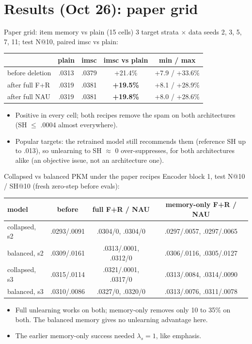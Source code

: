 \documentclass{beamer}
\begin{document}
\section{Results (Oct 26): paper grid}

\begin{frame}{Paper grid: item memory vs plain (15 cells)}
3 target strata $\times$ data seeds 2, 3, 5, 7, 11; test N@10, paired imsc vs plain:
\begin{center}
\footnotesize\setlength{\tabcolsep}{4pt}
\begin{tabular}{|l|c|c|c|c|}
\hline
 & plain & imsc & imsc vs plain & min / max \\
\hline
before deletion   & .0313 & .0379 & +21.4\% & +7.9 / +33.6\% \\
after full F+R    & .0319 & .0381 & \textbf{+19.5\%} & +8.1 / +28.9\% \\
after full NAU    & .0319 & .0381 & \textbf{+19.8\%} & +8.0 / +28.6\% \\
\hline
\end{tabular}
\end{center}
\begin{itemize}
  \item Positive in every cell; both recipes remove the spam on both
        architectures (SH $\leq$ .0004 almost everywhere).
  \item Popular targets: the retrained model still recommends them (reference SH
        up to .013), so unlearning to SH $\approx$ 0 over-suppresses, for both
        architectures alike (an objective issue, not an architecture one).
\end{itemize}
\end{frame}

\begin{frame}{Collapsed vs balanced PKM under the paper recipes}
Encoder block 1, test N@10 / SH@10 (fresh zero-step before evals):
\begin{center}
\footnotesize\setlength{\tabcolsep}{3pt}
\begin{tabular}{|l|c|c|c|}
\hline
model & before & full F+R / NAU & memory-only F+R / NAU \\
\hline
collapsed, s2 & .0293/.0091 & .0304/0, .0304/0 & .0297/.0057, .0297/.0065 \\
balanced, s2  & .0309/.0161 & .0313/.0001, .0312/0 & .0306/.0116, .0305/.0127 \\
collapsed, s3 & .0315/.0114 & .0321/.0001, .0317/0 & .0313/.0084, .0314/.0090 \\
balanced, s3  & .0310/.0086 & .0327/0, .0320/0 & .0313/.0076, .0311/.0078 \\
\hline
\end{tabular}
\end{center}
\begin{itemize}
  \item Full unlearning works on both; memory-only removes only 10 to 35\% on
        both. The balanced memory gives no unlearning advantage here.
  \item The earlier memory-only success needed $\lambda_s = 1$, like emphasis.
\end{itemize}
\end{frame}
\end{document}

